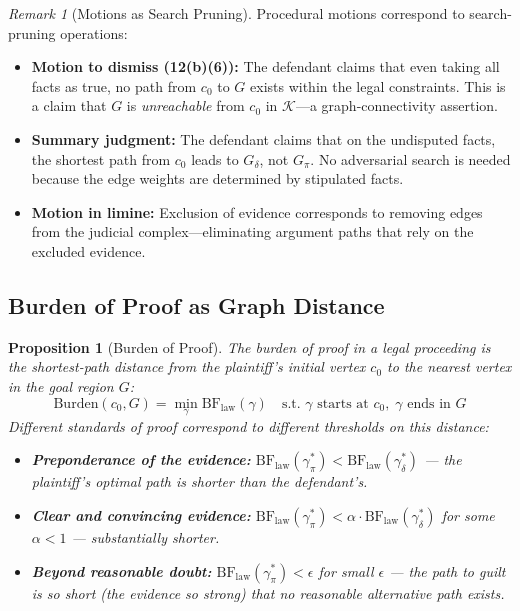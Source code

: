 \documentclass[12pt]{article}
\newtheorem{proposition}[theorem]{Proposition}
\theoremstyle{definition}
\theoremstyle{remark}
\newtheorem{remark}[theorem]{Remark}
\newcommand{\BF}{\mathrm{BF}}
\begin{document}
\begin{remark}[Motions as Search Pruning]
Procedural motions correspond to search-pruning operations:
\begin{itemize}
    \item \textbf{Motion to dismiss (12(b)(6)):} The defendant claims that even taking all facts as true, no path from $c_0$ to $G$ exists within the legal constraints.  This is a claim that $G$ is \emph{unreachable} from $c_0$ in $\mathcal{K}$---a graph-connectivity assertion.
    \item \textbf{Summary judgment:} The defendant claims that on the undisputed facts, the shortest path from $c_0$ leads to $G_\delta$, not $G_\pi$.  No adversarial search is needed because the edge weights are determined by stipulated facts.
    \item \textbf{Motion in limine:} Exclusion of evidence corresponds to removing edges from the judicial complex---eliminating argument paths that rely on the excluded evidence.
\end{itemize}
\end{remark}

\subsection{Burden of Proof as Graph Distance}

\begin{proposition}[Burden of Proof]
\label{prop:burden}
The \emph{burden of proof} in a legal proceeding is the shortest-path distance from the plaintiff's initial vertex $c_0$ to the nearest vertex in the goal region $G$:
\begin{equation}
\text{Burden}(c_0, G) = \min_{\gamma} \BF_{\text{law}}(\gamma) \quad \text{s.t. } \gamma \text{ starts at } c_0,\; \gamma \text{ ends in } G
\label{eq:burden}
\end{equation}
Different standards of proof correspond to different thresholds on this distance:
\begin{itemize}
    \item \textbf{Preponderance of the evidence:} $\BF_{\text{law}}(\gamma^*_\pi) < \BF_{\text{law}}(\gamma^*_\delta)$ --- the plaintiff's optimal path is shorter than the defendant's.
    \item \textbf{Clear and convincing evidence:} $\BF_{\text{law}}(\gamma^*_\pi) < \alpha \cdot \BF_{\text{law}}(\gamma^*_\delta)$ for some $\alpha < 1$ --- substantially shorter.
    \item \textbf{Beyond reasonable doubt:} $\BF_{\text{law}}(\gamma^*_\pi) < \epsilon$ for small $\epsilon$ --- the path to guilt is so short (the evidence so strong) that no reasonable alternative path exists.
\end{itemize}
\end{proposition}
\end{document}
